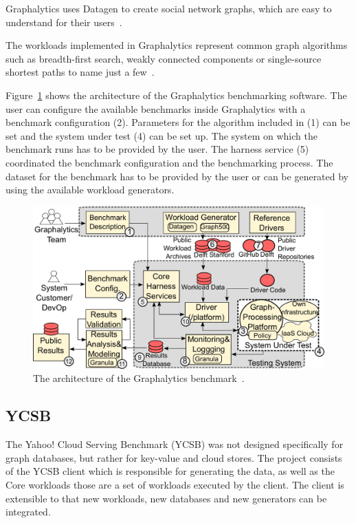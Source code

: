 Graphalytics uses Datagen to create social network graphs,
which are easy to understand for their users~\cite[3]{Capota2015c}.

The workloads implemented in Graphalytics represent common graph algorithms such as breadth-first search,
weakly connected components or single-source shortest paths to name just a few~\cite[7]{Iosup}.

Figure~\ref{fig:graphalyticsArchitecture} shows the architecture of the Graphalytics benchmarking software.
The user can configure the available benchmarks inside Graphalytics with a benchmark configuration (2).
Parameters for the algorithm included in (1) can be set and the system under test (4) can be set up.
The system on which the benchmark runs has to be provided by the user.
The harness service (5) coordinated the benchmark configuration and the benchmarking process.
The dataset for the benchmark has to be provided by the user or can be generated by using the available workload generators.~\cite[11]{Iosup}
\pagebreak

\begin{figure}[h!]
  \centering
  \includegraphics[width=.75\textwidth]{images/benchmarks/GraphalyticsArchitecture}
  \caption{The architecture of the Graphalytics benchmark~\cite[11]{Iosup}.}
  \label{fig:graphalyticsArchitecture}
\end{figure}

\subsection{YCSB}
\label{ch:background:se:ycsb}
The Yahoo! Cloud Serving Benchmark (YCSB) was not designed specifically for graph databases,
but rather for key-value and cloud stores.
The project consists of the YCSB client which is responsible for generating the data,
as well as the Core workloads those are a set of workloads executed by the client.
The client is extensible to that new workloads,
new databases and new generators can be integrated.~\cite{Yahoo!2010}

